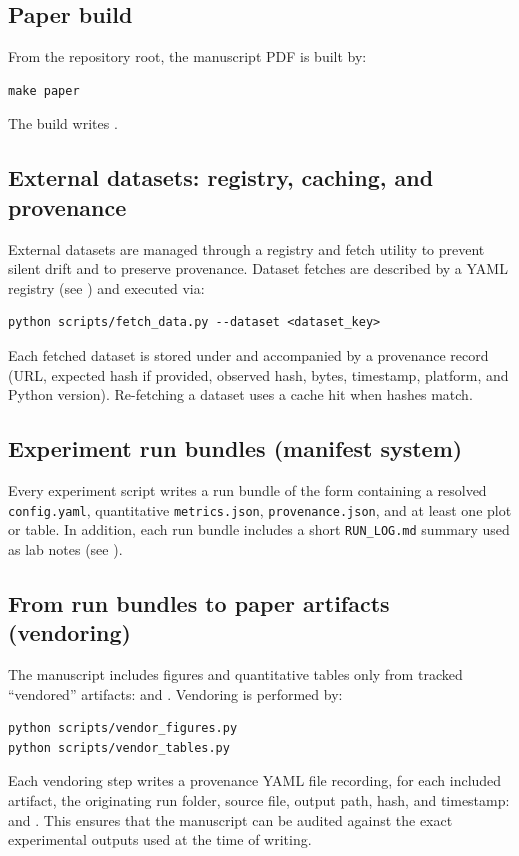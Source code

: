 \documentclass[11pt]{article}
\theoremstyle{definition}
\theoremstyle{plain}
\theoremstyle{remark}
\begin{document}
\subsection{Paper build}\label{app:repro:paper}
From the repository root, the manuscript PDF is built by:
\begin{verbatim}
make paper
\end{verbatim}
The build writes \texttt{}.

\subsection{External datasets: registry, caching, and provenance}\label{app:repro:data}
External datasets are managed through a registry and fetch utility to prevent silent drift and to preserve provenance. Dataset fetches are described by a YAML registry (see \texttt{}) and executed via:
\begin{verbatim}
python scripts/fetch_data.py --dataset <dataset_key>
\end{verbatim}
Each fetched dataset is stored under \texttt{} and accompanied by a provenance record (URL, expected hash if provided, observed hash, bytes, timestamp, platform, and Python version). Re-fetching a dataset uses a cache hit when hashes match.

\subsection{Experiment run bundles (manifest system)}\label{app:repro:manifests}
Every experiment script writes a run bundle of the form
\texttt{}
containing a resolved \texttt{config.yaml}, quantitative \texttt{metrics.json}, \texttt{provenance.json}, and at least one plot or table. In addition, each run bundle includes a short \texttt{RUN\_LOG.md} summary used as lab notes (see \texttt{}).

\subsection{From run bundles to paper artifacts (vendoring)}\label{app:repro:vendoring}
The manuscript includes figures and quantitative tables only from tracked ``vendored'' artifacts:
\texttt{} and \texttt{}.
Vendoring is performed by:
\begin{verbatim}
python scripts/vendor_figures.py
python scripts/vendor_tables.py
\end{verbatim}
Each vendoring step writes a provenance YAML file recording, for each included artifact, the originating run folder, source file, output path, hash, and timestamp:
\texttt{} and
\texttt{}.
This ensures that the manuscript can be audited against the exact experimental outputs used at the time of writing.
\end{document}
